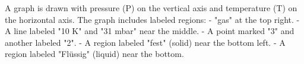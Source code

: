 A graph is drawn with pressure (P) on the vertical axis and temperature (T) on the horizontal axis. The graph includes labeled regions:  
- "gas" at the top right.  
- A line labeled "10 K" and "31 mbar" near the middle.  
- A point marked "3" and another labeled "2".  
- A region labeled "fest" (solid) near the bottom left.  
- A region labeled "Flüssig" (liquid) near the bottom.